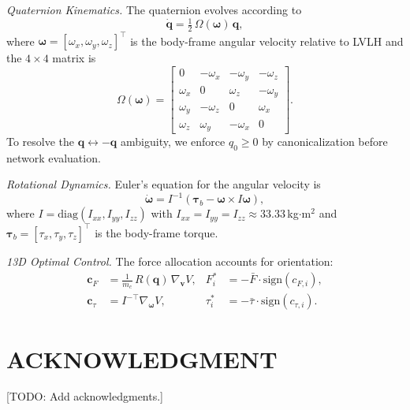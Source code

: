 \documentclass[letterpaper, 10 pt, conference]{ieeeconf}
\begin{document}
\textit{Quaternion Kinematics.}
The quaternion evolves according to
\begin{equation}\label{eq:qdot}
\dot{\mathbf{q}} = \tfrac{1}{2}\,\Omega(\bm{\omega})\,\mathbf{q},
\end{equation}
where $\bm{\omega} = [\omega_x, \omega_y, \omega_z]^\top$ is the body-frame angular velocity relative to LVLH and the $4\times4$ matrix is
\begin{equation}\label{eq:omega_mat}
\Omega(\bm{\omega}) = \begin{bmatrix}
0 & -\omega_x & -\omega_y & -\omega_z \\
\omega_x & 0 & \omega_z & -\omega_y \\
\omega_y & -\omega_z & 0 & \omega_x \\
\omega_z & \omega_y & -\omega_x & 0
\end{bmatrix}\!.
\end{equation}
To resolve the $\mathbf{q} \leftrightarrow -\mathbf{q}$ ambiguity, we enforce $q_0 \geq 0$ by canonicalization before network evaluation.

\textit{Rotational Dynamics.}
Euler's equation for the angular velocity is
\begin{equation}\label{eq:euler}
\dot{\bm{\omega}} = I^{-1}\!\left(\bm{\tau}_b - \bm{\omega} \times I\bm{\omega}\right)\!,
\end{equation}
where $I = \mathrm{diag}(I_{xx}, I_{yy}, I_{zz})$ with $I_{xx} = I_{yy} = I_{zz} \approx 33.33$\,kg$\cdot$m$^2$ and $\bm{\tau}_b = [\tau_x, \tau_y, \tau_z]^\top$ is the body-frame torque.

\textit{13D Optimal Control.}
The force allocation accounts for orientation:
\begin{align}\label{eq:13d_control}
\mathbf{c}_F &= \tfrac{1}{m_c}\,R(\mathbf{q})\,\nabla_{\mathbf{v}} V, & F_i^* &= -\bar{F}\cdot\mathrm{sign}(c_{F,i}), \nonumber\\
\mathbf{c}_\tau &= I^{-\!\top}\!\nabla_{\bm{\omega}} V, & \tau_i^* &= -\bar{\tau}\cdot\mathrm{sign}(c_{\tau,i}).
\end{align}

\section*{ACKNOWLEDGMENT}

[TODO: Add acknowledgments.]




\end{document}
